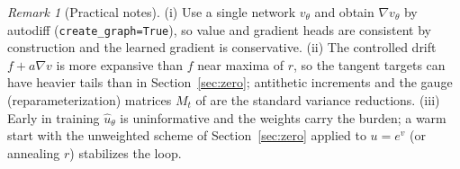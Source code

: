 \documentclass[11pt]{article}
\theoremstyle{definition}
\theoremstyle{remark}
\newtheorem{remark}[theorem]{Remark}
\newcommand{\grad}{\nabla}
\newcommand{\uhat}{\hat{u}}
\begin{document}
\begin{remark}[Practical notes]
(i) Use a single network $v_\theta$ and obtain $\grad v_\theta$ by autodiff
(\texttt{create\_graph=True}), so value and gradient heads are consistent by construction and
the learned gradient is conservative. (ii) The controlled drift $f + a\grad v$ is more
expansive than $f$ near maxima of $r$, so the tangent targets can have heavier tails than in
Section~\ref{sec:zero}; antithetic increments and the gauge (reparameterization) matrices
$M_t$ of \cite{SOCM} are the standard variance reductions. (iii) Early in training
$\uhat_\theta$ is uninformative and the weights carry the burden; a warm start with the
unweighted scheme of Section~\ref{sec:zero} applied to $u = e^{v}$ (or annealing $r$)
stabilizes the loop.
\end{remark}
\end{document}

